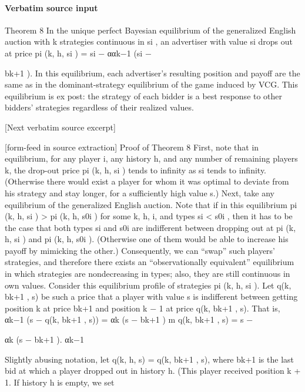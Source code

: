 \documentclass[10pt]{article}
\begin{document}
\paragraph{Verbatim source input}
\begin{ReviewVerbatim}
Theorem 8 In the unique perfect Bayesian equilibrium of the generalized English auction with
k
strategies continuous in si , an advertiser with value si drops out at price pi (k, h, si ) = si − ααk−1
(si −

bk+1 ). In this equilibrium, each advertiser’s resulting position and payoff are the same as in the
dominant-strategy equilibrium of the game induced by VCG. This equilibrium is ex post: the strategy
of each bidder is a best response to other bidders’ strategies regardless of their realized values.

[Next verbatim source excerpt]


[form-feed in source extraction]
Proof of Theorem 8
First, note that in equilibrium, for any player i, any history h, and any number of remaining players
k, the drop-out price pi (k, h, si ) tends to infinity as si tends to infinity. (Otherwise there would
exist a player for whom it was optimal to deviate from his strategy and stay longer, for a sufficiently
high value s.) Next, take any equilibrium of the generalized English auction. Note that if in this
equilibrium pi (k, h, si ) > pi (k, h, s0i ) for some k, h, i, and types si < s0i , then it has to be the
case that both types si and s0i are indifferent between dropping out at pi (k, h, si ) and pi (k, h, s0i ).
(Otherwise one of them would be able to increase his payoff by mimicking the other.) Consequently,
we can “swap” such players’ strategies, and therefore there exists an “observationally equivalent”
equilibrium in which strategies are nondecreasing in types; also, they are still continuous in own
values. Consider this equilibrium profile of strategies pi (k, h, si ).
Let q(k, bk+1 , s) be such a price that a player with value s is indifferent between getting position
k at price bk+1 and position k − 1 at price q(k, bk+1 , s). That is,
αk−1 (s − q(k, bk+1 , s)) = αk (s − bk+1 )
m
q(k, bk+1 , s) = s −

αk
(s − bk+1 ).
αk−1

Slightly abusing notation, let q(k, h, s) = q(k, bk+1 , s), where bk+1 is the last bid at which a player
dropped out in history h. (This player received position k + 1. If history h is empty, we set
\end{ReviewVerbatim}
\end{document}

